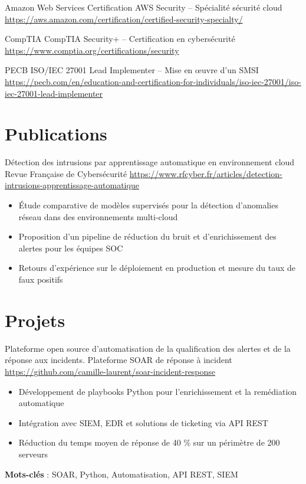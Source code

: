 \documentclass[a4paper, serif, 10pt]{moderncv}
\begin{document}
        {Amazon Web Services}
        {Certification AWS Security – Spécialité sécurité cloud}
        {\url{https://aws.amazon.com/certification/certified-security-specialty/}}
        {}
        {}

        {CompTIA}
        {CompTIA Security+ – Certification en cybersécurité}
        {\url{https://www.comptia.org/certifications/security}}
        {}
        {}

        {PECB}
        {ISO/IEC 27001 Lead Implementer – Mise en œuvre d'un SMSI}
        {\url{https://pecb.com/en/education-and-certification-for-individuals/iso-iec-27001/iso-iec-27001-lead-implementer}}
        {}
        {}
\section{Publications}

        {Détection des intrusions par apprentissage automatique en environnement cloud}
        {Revue Française de Cybersécurité}
        {\url{https://www.rfcyber.fr/articles/detection-intrusions-apprentissage-automatique}}
        {}
        {\begin{itemize}
\item Étude comparative de modèles supervisés pour la détection d'anomalies réseau dans des environnements multi-cloud
\item Proposition d'un pipeline de réduction du bruit et d'enrichissement des alertes pour les équipes SOC
\item Retours d'expérience sur le déploiement en production et mesure du taux de faux positifs
\end{itemize}}
\section{Projets}

        {Plateforme open source d'automatisation de la qualification des alertes et de la réponse aux incidents.}
        {Plateforme SOAR de réponse à incident}
        {\url{https://github.com/camille-laurent/soar-incident-response}}
        {}
        {\begin{itemize}
\item Développement de playbooks Python pour l'enrichissement et la remédiation automatique
\item Intégration avec SIEM, EDR et solutions de ticketing via API REST
\item Réduction du temps moyen de réponse de 40 \% sur un périmètre de 200 serveurs
\end{itemize}
\textbf{Mots-clés} : SOAR, Python, Automatisation, API REST, SIEM}
\end{document}
